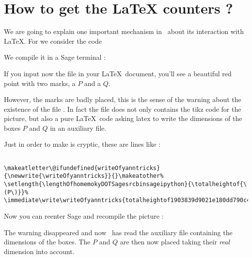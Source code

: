 \section{How to get the LaTeX counters ?}
\label{SECooKVXMooMKJAXV}

We are going to explain one important mechanism in \yanntricks\ about its interaction with \LaTeX. For we consider the code



We compile it in a Sage terminal :



If you input now the file  in your \LaTeX\ document, you'll see a beautiful red point with two marks, a \( P\) and a \( Q\).  

\begin{center}
   
\end{center}

However, the marks are badly placed, this is the sense of the warning about the existence of the file . In fact the file  does not only contains the tikz code for the picture, but also a pure \LaTeX\ code asking latex to write the dimensions of the boxes \( P\) and \( Q\) in an auxiliary file.

Just in order to make is cryptic, these are lines like :
\begin{verbatim}

\makeatletter\@ifundefined{writeOfyanntricks}{\newwrite{\writeOfyanntricks}}{}\makeatother%
\setlength{\lengthOfhomemokyDOTSagesrcbinsageipython}{\totalheightof{\(P\)}}%
\immediate\write\writeOfyanntricks{totalheightof1903839d9021e180dd790c4cc63081c63b2fe6f1:\the\lengthOfhomemokyDOTSagesrcbinsageipython-}
\end{verbatim}

Now you can reenter Sage and recompile the picture :



The warning disappeared and now \yanntricks\ has read the auxiliary file containing the dimensions of the boxes. The \( P\) and \( Q\) are then now placed taking their \emph{real} dimension into account.

